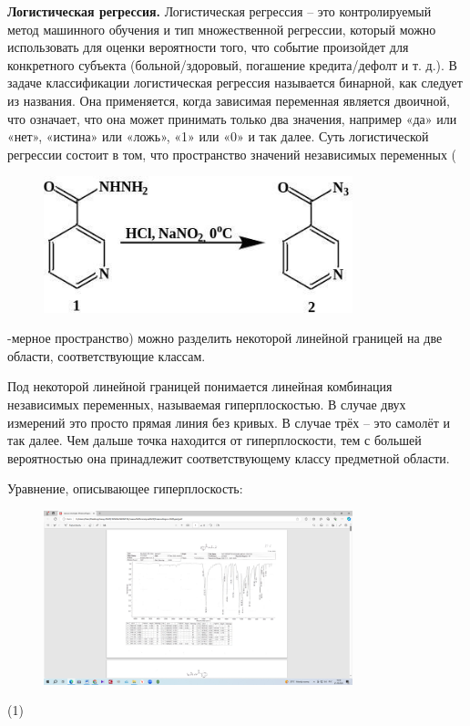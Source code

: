 {\bfseries Логистическая регрессия.} Логистическая регрессия -- это
контролируемый метод машинного обучения и тип множественной регрессии,
который можно использовать для оценки вероятности того, что событие
произойдет для конкретного субъекта (больной/здоровый, погашение
кредита/дефолт и т. д.). В задаче классификации логистическая регрессия
называется бинарной, как следует из названия. Она применяется, когда
зависимая переменная является двоичной, что означает, что она может
принимать только два значения, например «да» или «нет», «истина» или
«ложь», «1» или «0» и так далее. Суть логистической регрессии состоит в
том, что пространство значений независимых переменных
(\begin{figure}[H]
	\centering
	\includegraphics[width=0.8\textwidth]{assets/1}
	\caption*{}
\end{figure}-мерное пространство) можно разделить
некоторой линейной границей на две области, соответствующие классам.

Под некоторой линейной границей понимается линейная комбинация
независимых переменных, называемая гиперплоскостью. В случае двух
измерений это просто прямая линия без кривых. В случае трёх -- это
самолёт и так далее. Чем дальше точка находится от гиперплоскости, тем с
большей вероятностью она принадлежит соответствующему классу предметной
области.

Уравнение, описывающее гиперплоскость:

\begin{figure}[H]
	\centering
	\includegraphics[width=0.8\textwidth]{assets/2}
	\caption*{}
\end{figure} (1)

